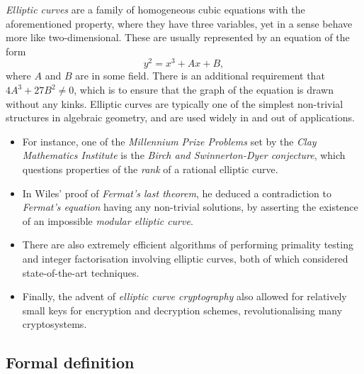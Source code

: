 \documentclass{article}
\begin{document}
\emph{Elliptic curves} are a family of homogeneous cubic equations with the aforementioned property, where they have three variables, yet in a sense behave more like two-dimensional. These are usually represented by an equation of the form
$$ y^2 = x^3 + Ax + B, $$
where $ A $ and $ B $ are in some field. There is an additional requirement that $ 4A^3 + 27B^2 \ne 0 $, which is to ensure that the graph of the equation is drawn without any kinks. Elliptic curves are typically one of the simplest non-trivial structures in algebraic geometry, and are used widely in and out of applications.
\begin{itemize}
\item For instance, one of the \emph{Millennium Prize Problems} set by the \emph{Clay Mathematics Institute} is the \emph{Birch and Swinnerton-Dyer conjecture}, which questions properties of the \emph{rank} of a rational elliptic curve.
\item In Wiles' proof of \emph{Fermat's last theorem}, he deduced a contradiction to \emph{Fermat's equation} having any non-trivial solutions, by asserting the existence of an impossible \emph{modular elliptic curve}.
\item There are also extremely efficient algorithms of performing primality testing and integer factorisation involving elliptic curves, both of which considered state-of-the-art techniques.
\item Finally, the advent of \emph{elliptic curve cryptography} also allowed for relatively small keys for encryption and decryption schemes, revolutionalising many cryptosystems.
\end{itemize}

\subsection{Formal definition}
\end{document}
